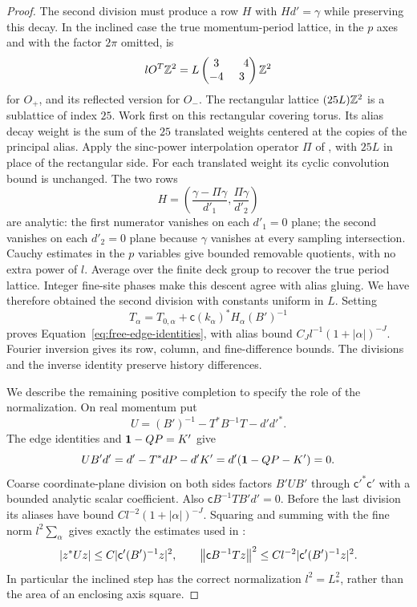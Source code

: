 \begin{proof}
The second division must produce a row $H$ with $Hd'=\gamma$ while
preserving this decay.  In the inclined case the true momentum-period
lattice, in the $p$ axes and with the factor $2\pi$ omitted, is
\[
 lO^T\mathbb Z^2
 =L\begin{pmatrix}3&\phantom{-}4\\-4&3\end{pmatrix}\mathbb Z^2
\]
for $O_+$, and its reflected version for $O_-$.
The rectangular lattice $(25L)\mathbb Z^2$ is a sublattice of index $25$.
Work first on this rectangular covering torus.  Its alias decay weight
is the sum of the $25$ translated weights centered at the copies of
the principal alias.  Apply the sinc-power interpolation operator
$\Pi$ of , with $25L$ in place of the rectangular
side.  For each translated weight its cyclic convolution bound is
unchanged.  The two rows
\[
 H=\left(\frac{\gamma-\Pi\gamma}{d'_1},
          \frac{\Pi\gamma}{d'_2}\right)
\]
are analytic: the first numerator vanishes on each $d'_1=0$ plane;
the second vanishes on each $d'_2=0$ plane because $\gamma$ vanishes
at every sampling intersection.  Cauchy estimates in the $p$ variables
give bounded removable quotients, with no extra power of $l$.
Average over the finite deck group to recover the true period lattice.
Integer fine-site phases make this descent agree with alias gluing.
We have therefore obtained the second division with constants uniform
in $L$.  Setting
\[
 T_\alpha=T_{0,\alpha}
       +\mathsf c(k_\alpha)^*H_\alpha(B')^{-1}
\]
proves Equation~\eqref{eq:free-edge-identities}, with alias bound
$C_Jl^{-1}(1+|\alpha|)^{-J}$.
Fourier inversion gives its row, column, and fine-difference bounds.
The divisions and the inverse identity preserve history differences.

We describe the remaining positive completion to specify the role of
the normalization.  On real momentum put
\[
 U=(B')^{-1}-T^*B^{-1}T-d'd'^*.
\]
The edge identities and $\mathbf 1-QP=K'$ give
\[
 UB'd'=d'-T^*dP-d'K'=d'(\mathbf 1-QP-K')=0.
\]
Coarse coordinate-plane division on both sides factors $B'UB'$
through $\mathsf c'^*\mathsf c'$ with a bounded analytic scalar
coefficient.  Also $\mathsf cB^{-1}TB'd'=0$.
Before the last division its aliases have bound
$Cl^{-2}(1+|\alpha|)^{-J}$.  Squaring and summing with the fine norm
$l^2\sum_\alpha$ gives exactly the estimates used in
:
\[
 |z^*Uz|\le C|\mathsf c'(B')^{-1}z|^2,
 \qquad
 \left\lVert\mathsf cB^{-1}Tz\right\rVert^2
 \le Cl^{-2}|\mathsf c'(B')^{-1}z|^2.
\]
In particular the inclined step has the correct normalization
$l^2=L_*^2$, rather than the area of an enclosing axis square.


\end{proof}
